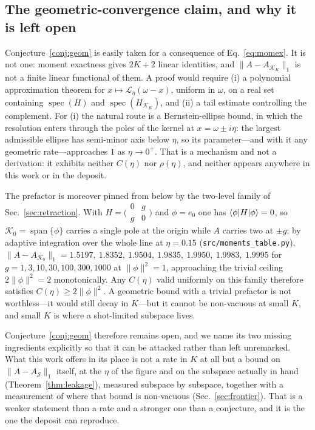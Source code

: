 \subsection{The geometric-convergence claim, and why it is left open}
\label{app:moments:conj}

Conjecture~\ref{conj:geom} is easily taken for a consequence of Eq.~\eqref{eq:momex}. It is not
one: moment exactness gives $2K+2$ linear identities, and $\lVert A-A_{\mathcal K_K}\rVert_1$ is not a
finite linear functional of them. A proof would require (i) a polynomial approximation theorem for
$x\mapsto\mathcal L_\eta(\omega-x)$, uniform in $\omega$, on a real set containing
$\operatorname{spec}(H)$ and $\operatorname{spec}(H_{\mathcal K_K})$, and (ii) a tail estimate
controlling the complement. For (i) the natural route is a Bernstein-ellipse bound, in which the
resolution enters through the poles of the kernel at $x=\omega\pm i\eta$: the largest admissible
ellipse has semi-minor axis below $\eta$, so its parameter---and with it any geometric rate---approaches
$1$ as $\eta\to0^{+}$. That is a mechanism and not a derivation: it exhibits neither $C(\eta)$
nor $\rho(\eta)$, and neither appears anywhere in this work or in the deposit.

The prefactor is moreover pinned from below by the two-level family of Sec.~\ref{sec:retraction}. With
$H=\bigl(\begin{smallmatrix}0&g\\ g&0\end{smallmatrix}\bigr)$ and $\phi=e_0$ one has
$\langle \phi|H|\phi \rangle=0$, so $\mathcal K_0=\operatorname{span}\{\phi\}$ carries a single pole at the
origin while $A$ carries two at $\pm g$; by adaptive integration over the whole line at $\eta=0.15$ (\texttt{src/moments\_table.py}), $\lVert A-A_{\mathcal K_0}\rVert_1=1.5197,\ 1.8352,\ 1.9504,\ 1.9835,\ 1.9950,\ 1.9983,\ 1.9995$ for
$g=1,3,10,30,100,300,1000$ at $\lVert\phi\rVert^{2}=1$, approaching the trivial ceiling
$2\lVert\phi\rVert^{2}=2$ monotonically. Any $C(\eta)$
valid uniformly on this family therefore satisfies $C(\eta)\ge2\lVert\phi\rVert^{2}$. A geometric bound
with a trivial prefactor is not worthless---it would still decay in $K$---but it cannot be non-vacuous
at small $K$, and small $K$ is where a shot-limited subspace lives.

Conjecture~\ref{conj:geom} therefore remains open, and we name its two missing ingredients
explicitly so that it can be attacked rather than left unremarked. What this work offers in its place
is not a rate in $K$ at all but a bound on $\lVert A-A_{\mathcal S}\rVert_1$ itself, at the $\eta$ of
the figure and on the subspace actually in hand (Theorem~\ref{thm:leakage}), measured subspace by
subspace, together with a measurement of where that bound is non-vacuous (Sec.~\ref{sec:frontier}).
That is a weaker statement than a rate and a stronger one than a conjecture, and it is the one the
deposit can reproduce.


